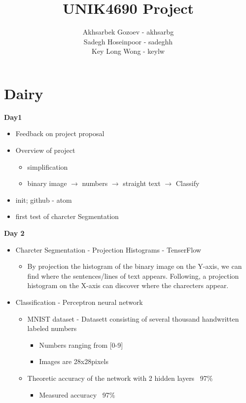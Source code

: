 \documentclass[11pt,a4paper,english]{article}
\title{UNIK4690 Project}
\author{
  Akhsarbek Gozoev  - akhsarbg \\
  Sadegh Hoseinpoor - sadeghh\\
  Key Long Wong - keylw
}
\newenvironment{loggentry}[2]%
{\noindent\textbf{#2}\marginnote{#1}\\}{\vspace{0.5cm}}
\begin{document}
\maketitle
\section*{Dairy}

\begin{loggentry}{19.04.18}{Day1}
\begin{itemize}
  \item{Feedback on project proposal}
  \item{Overview of project}
    \begin{itemize}
     \item{simplification}
     \item{binary image $\rightarrow$ numbers $\rightarrow$ straight text $\rightarrow$ Classify}
   \end{itemize}
  \item{init; github - atom}
  \item{first test of charcter Segmentation}
\end{itemize}
\end{loggentry}

\begin{loggentry}{26.04.18}{Day 2}
\begin{itemize}
  \item{Charcter Segmentation - Projection Histograms - TenserFlow}
  \begin{itemize}
    \item{By projection the histogram of the binary image on the Y-axis,
    we can find where the sentences/lines of text appears. Following, a
    projection histogram on the X-axis can discover where the charecters
    appear.}
  \end{itemize}
  \item{Classification - Perceptron neural network}
    \begin{itemize}
      \item{MNIST dataset - Datasett consisting of several thousand handwritten
      labeled numbers}
      \begin{itemize}
        \item{Numbers ranging from [0-9]}
        \item{Images are 28x28pixels}
      \end{itemize}
      \item{Theoretic accuracy of the network with 2 hidden layers ~97\%}
      \begin{itemize}
        \item{Measured accuracy ~97\%}
      \end{itemize}
    \end{itemize}
\end{itemize}
\end{loggentry}
\end{document}
